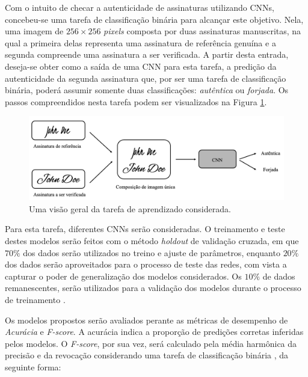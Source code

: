 


Com o intuito de checar a autenticidade de assinaturas utilizando CNNs, concebeu-se uma tarefa de classificação binária para alcançar este objetivo. Nela, uma imagem de $256 \times 256$ \emph{pixels} composta por duas assinaturas manuscritas, na qual a primeira delas representa uma assinatura de referência genuína e a segunda compreende uma assinatura a ser verificada. A partir desta entrada, deseja-se obter como a saída de uma CNN para esta tarefa, a predição da autenticidade da segunda assinatura que, por ser uma tarefa de classificação binária, poderá assumir somente duas classificações: \emph{autêntica} ou \emph{forjada}. Os passos compreendidos nesta tarefa podem ser visualizados na Figura \ref{fig:esquema-solucao}.

\begin{figure}[h!]
  \centering
  \caption{Uma visão geral da tarefa de aprendizado considerada.}
  \label{fig:esquema-solucao}
  \includegraphics[width=\textwidth]{imgs/esquema-solucao}
\end{figure}

Para esta tarefa, diferentes CNNs serão consideradas. O treinamento e teste destes modelos serão feitos com o método \emph{holdout} de validação cruzada, em que $70\%$ dos dados serão utilizados no treino e ajuste de parâmetros, enquanto $20\%$ dos dados serão aproveitados para o processo de teste das redes, com vista a capturar o poder de generalização dos modelos considerados. Os $10\%$ de dados remanescentes, serão utilizados para a validação dos modelos durante o processo de treinamento \cite{brink}.

Os modelos propostos serão avaliados perante as métricas de desempenho de \emph{Acurácia} e \emph{F-score}. A acurácia indica a proporção de predições corretas inferidas pelos modelos. O \emph{F-score}, por sua vez, será calculado pela média harmônica da precisão e da revocação considerando uma tarefa de classificação binária \cite{marsland}, da seguinte forma:

